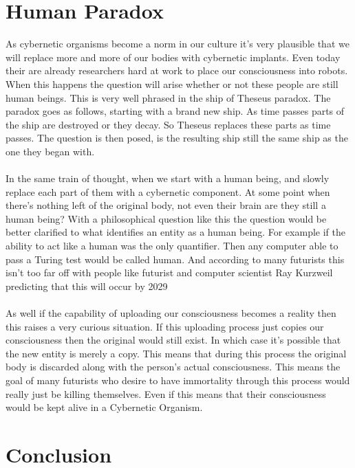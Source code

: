 \documentclass[12pt,a4paper,notitlepage]{article}
\begin{document}
\section{Human Paradox}
As cybernetic organisms become a norm in our culture it's very plausible that we
will replace more and more of our bodies with cybernetic implants. Even today
their are already researchers hard at work to place our consciousness into
robots. When this happens the question will arise whether or not these people
are still human beings. This is very well phrased in the ship of Theseus
paradox\cite{Theseus}. The paradox goes as follows, starting with a brand new
ship. As time passes parts of the ship are destroyed or they decay. So Theseus
replaces these parts as time passes. The question is then posed, is the
resulting ship still the same ship as the one they began with. 
\\\\
In the same train of thought, when we start with a human being, and slowly
replace each part of them with a cybernetic component. At some point when
there's nothing left of the original body, not even their brain are they still a
human being? With a philosophical question like this the question would be
better clarified to what identifies an entity as a human being. For example if
the ability to act like a human was the only quantifier. Then any computer able
to pass a Turing test would be called human. And according to many futurists
this isn't too far off with people like futurist and computer scientist Ray
Kurzweil predicting that this will occur by 2029\cite{Kurzweil}
\\\\
As well if the capability of uploading our consciousness becomes a reality then
this raises a very curious situation. If this uploading process just copies our
consciousness then the original would still exist. In which case it's possible
that the new entity is merely a copy. This means that during this process the
original body is discarded along with the person's actual consciousness. This
means the goal of many futurists who desire to have immortality through this
process would really just be killing themselves. Even if this means that their
consciousness would be kept alive in a Cybernetic Organism.

\section{Conclusion}
\end{document}
